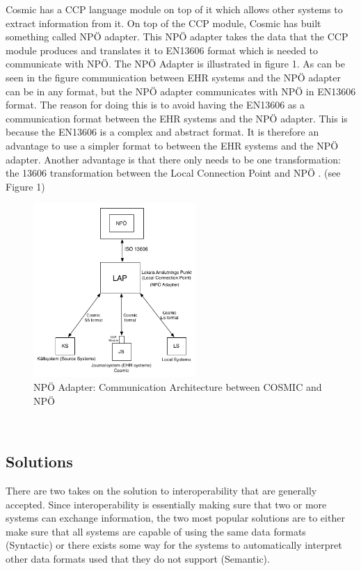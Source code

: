\documentclass[14pt]{article}
\begin{document}
Cosmic has a CCP language module on top of it which allows other systems to extract information from it. On top of the CCP module, Cosmic has built something called NPÖ adapter. This NPÖ adapter takes the data that the CCP module produces and translates it to \gls{EN13606} format which is needed to communicate with NPÖ. The NPÖ Adapter is illustrated in figure 1. As can be seen in the figure communication between \gls{EHR} systems and the NPÖ adapter can be in any format, but the NPÖ adapter communicates with NPÖ in \gls{EN13606} format. The reason for doing this is to avoid having the \gls{EN13606} as a communication format between the \gls{EHR} systems and the NPÖ adapter. This is because the \gls{EN13606} is a complex and abstract format. It is therefore an advantage to use a simpler format to between the \gls{EHR} systems and the NPÖ adapter. Another advantage is that there only needs to be one transformation: the 13606 transformation between the Local Connection Point and NPÖ  \cite{ViktorJernelov}. (see Figure 1) 

\begin{figure}[h!]
  \caption{NPÖ Adapter: Communication Architecture between COSMIC and NPÖ}
  \centering
    \includegraphics[width=0.55\textwidth]{Images/npoAdapt}
\end{figure}\

\subsection{Solutions}
There are two takes on the solution to interoperability that are generally accepted.  Since interoperability is essentially making sure that two or more systems can exchange information, the two most popular solutions are to either make sure that all systems are capable of using the same data formats (Syntactic) or there exists some way for the systems to automatically interpret other data formats used that they do not support (Semantic).
\end{document}
